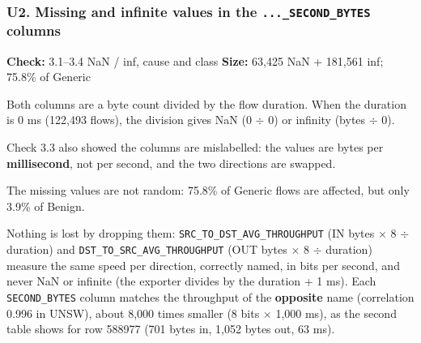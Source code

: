 \documentclass[10pt,a4paper]{article}
\newcommand{\meta}[2]{{\small\color{muted}\textbf{Check:} #1 \quad\textbar\quad \textbf{Size:} #2}}
\newenvironment{problem}{\par\noindent\begin{minipage}{\linewidth}\setlength{\parskip}{4pt}}{\end{minipage}\par\bigskip}
\begin{document}
\begin{problem}
\subsubsection*{U2. Missing and infinite values in the \texttt{...\_\allowbreak{}SECOND\_\allowbreak{}BYTES} columns}
\meta{3.1--3.4 NaN / inf, cause and class}{63,425 NaN + 181,561 inf; 75.8\% of Generic}

Both columns are a byte count divided by the flow duration. When the duration is 0 ms (122,493 flows), the division gives NaN (0 $\div$ 0) or infinity (bytes $\div$ 0).

Check 3.3 also showed the columns are mislabelled: the values are bytes per \textbf{millisecond}, not per second, and the two directions are swapped.

The missing values are not random: 75.8\% of Generic flows are affected, but only 3.9\% of Benign.

Nothing is lost by dropping them: \texttt{SRC\_\allowbreak{}TO\_\allowbreak{}DST\_\allowbreak{}AVG\_\allowbreak{}THROUGHPUT} (IN bytes $\times$ 8 $\div$ duration) and \texttt{DST\_\allowbreak{}TO\_\allowbreak{}SRC\_\allowbreak{}AVG\_\allowbreak{}THROUGHPUT} (OUT bytes $\times$ 8 $\div$ duration) measure the same speed per direction, correctly named, in bits per second, and never NaN or infinite (the exporter divides by the duration + 1 ms). Each \texttt{SECOND\_\allowbreak{}BYTES} column matches the throughput of the \textbf{opposite} name (correlation 0.996 in UNSW), about 8,000 times smaller (8 bits $\times$ 1,000 ms), as the second table shows for row 588977 (701 bytes in, 1,052 bytes out, 63 ms).


\end{problem}
\end{document}
